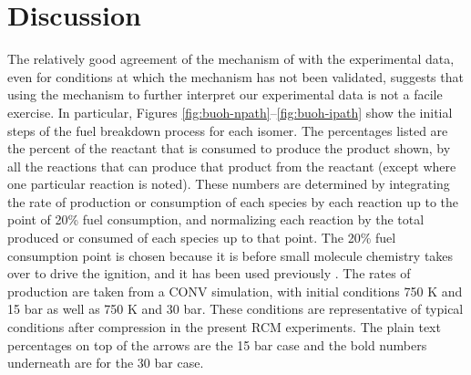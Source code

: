 \documentclass[12pt, letterpaper]{article}
\begin{document}
\section{Discussion}
\label{sec:buoh-discussion}

The relatively good agreement of the mechanism of \textcite{Sarathy2012} with
the experimental data, even for conditions at which the mechanism has not been
validated, suggests that using the mechanism to further interpret our
experimental data is not a facile exercise. In particular, Figures
\ref{fig:buoh-npath}--\ref{fig:buoh-ipath} show the initial steps of the fuel
breakdown process for each isomer. The percentages listed are the percent of
the reactant that is consumed to produce the product shown, by all the
reactions that can produce that product from the reactant (except where one
particular reaction is noted). These numbers are determined by integrating the
rate of production or consumption of each species by each reaction up to the
point of 20\% fuel consumption, and normalizing each reaction by the total
produced or consumed of each species up to that point. The 20\% fuel
consumption point is chosen because it is before small molecule chemistry takes
over to drive the ignition, and it has been used previously
\cite{Weber2011,Sarathy2012}. The rates of production are taken from a CONV
simulation, with initial conditions 750 K and 15 bar as well as 750 K and 30
bar. These conditions are representative of typical conditions after compression
in the present RCM experiments. The plain text percentages on top of the arrows
are the 15 bar case and the bold numbers underneath are for the 30 bar case.
\end{document}
